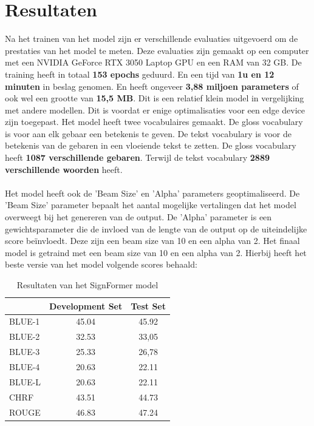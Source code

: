 \section{Resultaten}
\label{sec:results}
Na het trainen van het model zijn er verschillende evaluaties uitgevoerd om de prestaties van het model te meten.
Deze evaluaties zijn gemaakt op een computer met een NVIDIA GeForce RTX 3050 Laptop GPU en een RAM van 32 GB.
De training heeft in totaal \textbf{153 epochs} geduurd.
En een tijd van \textbf{1u en 12 minuten} in beslag genomen.
En heeft ongeveer \textbf{3,88 miljoen parameters} of ook wel een grootte van \textbf{15,5 MB}.
Dit is een relatief klein model in vergelijking met andere modellen.
Dit is voordat er enige optimalisaties voor een edge device zijn toegepast.
Het model heeft twee vocabulaires gemaakt.
De gloss vocabulary is voor aan elk gebaar een betekenis te geven.
De tekst vocabulary is voor de betekenis van de gebaren in een vloeiende tekst te zetten.
De gloss vocabulary heeft \textbf{1087 verschillende gebaren}.
Terwijl de tekst vocabulary \textbf{2889 verschillende woorden} heeft.
\\
\\
Het model heeft ook de 'Beam Size' en 'Alpha' parameters geoptimaliseerd.
De 'Beam Size' parameter bepaalt het aantal mogelijke vertalingen dat het model overweegt bij het genereren van de output.
De 'Alpha' parameter is een gewichtsparameter die de invloed van de lengte van de output op de uiteindelijke score beïnvloedt.
Deze zijn een beam size van 10 en een alpha van 2.
Het finaal model is getraind met een beam size van 10 en een alpha van 2.
Hierbij heeft het beste versie van het model volgende scores behaald:
\begin{table}[h]
  \begin{tabular}{ |l||c|c| |}
    \hline
    & Development Set & Test Set \\
    \hline
    BLUE-1 & 45.04 & 45.92 \\
    \hline
    BLUE-2 & 32.53 & 33,05 \\
    \hline
    BLUE-3 & 25.33 & 26,78 \\
    \hline
    BLUE-4 & 20.63 & 22.11 \\
    \hline
    BLUE-L & 20.63 & 22.11 \\
    \hline
    CHRF & 43.51 & 44.73 \\
    \hline
    ROUGE & 46.83 & 47.24 \\
    \hline
  \end{tabular}
  \caption{Resultaten van het SignFormer model}
  \label{tab:results-training}
\end{table}
